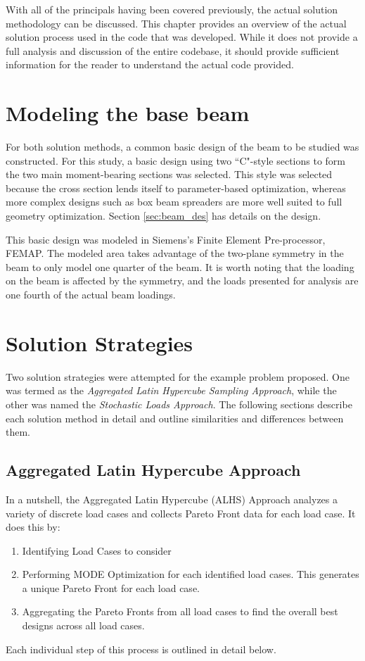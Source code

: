 With all of the principals having been covered previously, the actual solution methodology can be discussed. This chapter provides an overview of the actual solution process used in the code that was developed. While it does not provide a full analysis and discussion of the entire codebase, it should provide sufficient information for the reader to understand the actual code provided. 

\section{Modeling the base beam}
For both solution methods, a common basic design of the beam to be studied was constructed. For this study, a basic design using two ``C"-style sections to form the two main moment-bearing sections was selected. This style was selected because the cross section lends itself to parameter-based optimization, whereas more complex designs such as box beam spreaders are more well suited to full geometry optimization. Section \ref{sec:beam_des} has details on the design. 

This basic design was modeled in Siemens's Finite Element Pre-processor, FEMAP. The modeled area takes advantage of the two-plane symmetry in the beam to only model one quarter of the beam. It is worth noting that the loading on the beam is affected by the symmetry, and the loads presented for analysis are one fourth of the actual beam loadings. 

\section{Solution Strategies}
Two solution strategies were attempted for the example problem proposed. One was termed as the \emph{Aggregated Latin Hypercube Sampling Approach}, while the other was named the \emph{Stochastic Loads Approach}. The following sections describe each solution method in detail and outline similarities and differences between them. 

\subsection{Aggregated Latin Hypercube Approach}

In a nutshell, the Aggregated Latin Hypercube (ALHS) Approach analyzes a variety of discrete load cases and collects Pareto Front data for each load case. It does this by:

\begin{enumerate}
\item Identifying Load Cases to consider
\item Performing MODE Optimization for each identified load cases. This generates a unique Pareto Front for each load case. 
\item Aggregating the Pareto Fronts from all load cases to find the overall best designs across all load cases. 
\end{enumerate}
Each individual step of this process is outlined in detail below. 

